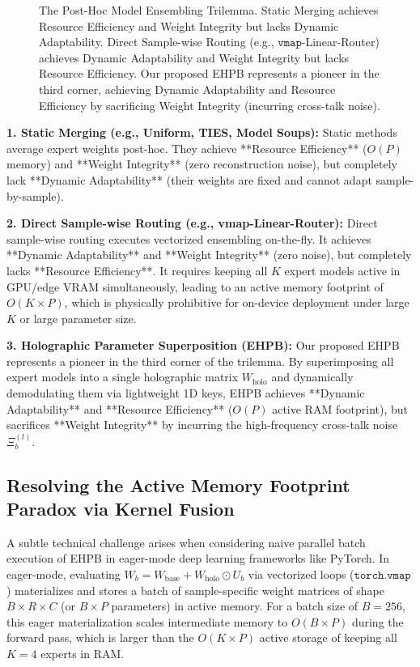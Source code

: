 \begin{figure}[t]
\begin{tikzpicture}
\end{tikzpicture}
\caption{The Post-Hoc Model Ensembling Trilemma. Static Merging achieves Resource Efficiency and Weight Integrity but lacks Dynamic Adaptability. Direct Sample-wise Routing (e.g., $\mathtt{vmap}$-Linear-Router) achieves Dynamic Adaptability and Weight Integrity but lacks Resource Efficiency. Our proposed EHPB represents a pioneer in the third corner, achieving Dynamic Adaptability and Resource Efficiency by sacrificing Weight Integrity (incurring cross-talk noise).}
\label{fig:ensembling_trilemma}
\end{figure}

\textbf{1. Static Merging (e.g., Uniform, TIES, Model Soups):}
Static methods average expert weights post-hoc. They achieve **Resource Efficiency** ($O(P)$ memory) and **Weight Integrity** (zero reconstruction noise), but completely lack **Dynamic Adaptability** (their weights are fixed and cannot adapt sample-by-sample).

\textbf{2. Direct Sample-wise Routing (e.g., vmap-Linear-Router):}
Direct sample-wise routing executes vectorized ensembling on-the-fly. It achieves **Dynamic Adaptability** and **Weight Integrity** (zero noise), but completely lacks **Resource Efficiency**. It requires keeping all $K$ expert models active in GPU/edge VRAM simultaneously, leading to an active memory footprint of $O(K \times P)$, which is physically prohibitive for on-device deployment under large $K$ or large parameter size.

\textbf{3. Holographic Parameter Superposition (EHPB):}
Our proposed EHPB represents a pioneer in the third corner of the trilemma. By superimposing all expert models into a single holographic matrix $W_{\text{holo}}$ and dynamically demodulating them via lightweight 1D keys, EHPB achieves **Dynamic Adaptability** and **Resource Efficiency** ($O(P)$ active RAM footprint), but sacrifices **Weight Integrity** by incurring the high-frequency cross-talk noise $\Xi_b^{(l)}$.

\subsection{Resolving the Active Memory Footprint Paradox via Kernel Fusion}
\label{subsec:kernel_fusion}

A subtle technical challenge arises when considering naive parallel batch execution of EHPB in eager-mode deep learning frameworks like PyTorch. In eager-mode, evaluating $W_b = W_{\text{base}} + W_{\text{holo}} \odot U_b$ via vectorized loops ($\mathtt{torch.vmap}$) materializes and stores a batch of sample-specific weight matrices of shape $B \times R \times C$ (or $B \times P$ parameters) in active memory. For a batch size of $B=256$, this eager materialization scales intermediate memory to $O(B \times P)$ during the forward pass, which is larger than the $O(K \times P)$ active storage of keeping all $K=4$ experts in RAM.


